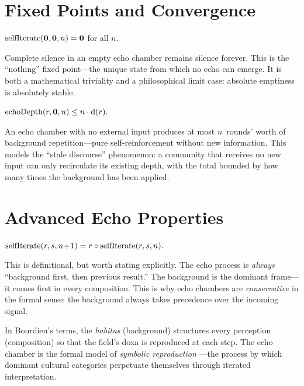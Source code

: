 \section{Fixed Points and Convergence}
\label{sec:echo-fixed}

\begin{theorem}
\label{thm:void-fixed-point}
$\mathrm{selfIterate}(\mathbf{0}, \mathbf{0}, n) = \mathbf{0}$ for all $n$.
\end{theorem}

Complete silence in an empty echo chamber remains silence forever.  This is
the ``nothing'' fixed point---the unique state from which no echo can
emerge.  It is both a mathematical triviality and a philosophical limit
case: absolute emptiness is absolutely stable.

\begin{theorem}
\label{thm:echo-void-depth}
$\mathrm{echoDepth}(r, \mathbf{0}, n) \le n\cdot\operatorname{d}(r).$
\end{theorem}

An echo chamber with no external input produces at most $n$~rounds' worth of
background repetition---pure self-reinforcement without new information.
This models the ``stale discourse'' phenomenon: a community that receives
no new input can only recirculate its existing depth, with the total bounded
by how many times the background has been applied.


\section{Advanced Echo Properties}
\label{sec:echo-advanced}

\begin{theorem}
\label{thm:echo-left-nested}
$\mathrm{selfIterate}(r, s, n\!+\!1) = r\circ\mathrm{selfIterate}(r,s,n).$
\end{theorem}

This is definitional, but worth stating explicitly.  The echo process is
\emph{always} ``background first, then previous result.''  The background
is the dominant frame---it comes first in every composition.  This is why
echo chambers are \emph{conservative} in the formal sense: the background
always takes precedence over the incoming signal.

In Bourdieu's terms, the \emph{habitus} (background) structures every
perception (composition) so that the field's doxa is reproduced at each
step.  The echo chamber is the formal model of \emph{symbolic reproduction}
---the process by which dominant cultural categories perpetuate themselves
through iterated interpretation.


